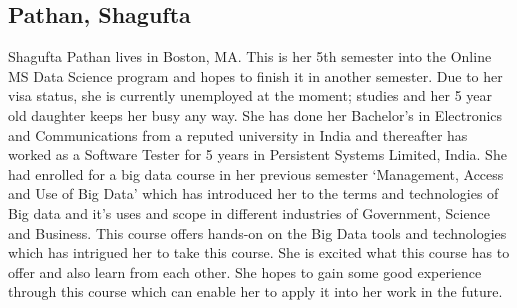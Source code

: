 \subsection{Pathan, Shagufta}

Shagufta Pathan lives in Boston, MA. This is her 5th semester into the Online MS
Data Science program and hopes to finish it in another semester. Due to her visa
status, she is currently unemployed at the moment; studies and her 5 year old 
daughter keeps her busy any way. She has done her Bachelor's in Electronics and
Communications from a reputed university in India and thereafter has worked as a
Software Tester for 5 years in Persistent Systems Limited, India. She had enrolled
for a big data course in her previous semester `Management, Access and Use of Big 
Data' which has introduced her to the terms and technologies of Big data and it's
uses and scope in different industries of Government, Science and Business. This
course offers hands-on on the Big Data tools and technologies which has intrigued 
her to take this course. She is excited what this course has to offer and also learn
from each other. She hopes to gain some good experience through this course which 
can enable her to apply it into her work in the future.
